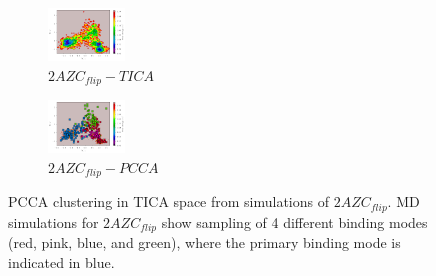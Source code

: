 \begin{figure}[!ht]
\centering
\begin{subfigure}{.5\textwidth}
  \centering
  \includegraphics[width=.9\linewidth]{chapter4/2AZC_flip/2AZC_flip-tica.pdf}
  \caption{$2AZC_{flip}-TICA$}
  \label{sup:2AZC_flip-tica}
\end{subfigure}%
\begin{subfigure}{.5\textwidth}
  \centering
  \includegraphics[width=.9\linewidth]{chapter4/2AZC_flip/2AZC_flip-pcca.pdf}
  \caption{$2AZC_{flip}-PCCA$}
  \label{sup:2AZC_flip-pcca}
\end{subfigure}
\caption{PCCA clustering in TICA space from simulations of $2AZC_{flip}$. MD simulations for $2AZC_{flip}$ show sampling of 4 different binding modes (red, pink, blue, and green), where the primary binding mode is indicated in blue.}
\label{sup:2AZC_flip-cluster}
\end{figure}

